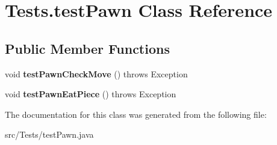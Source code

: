 \hypertarget{class_tests_1_1test_pawn}{}\section{Tests.\+test\+Pawn Class Reference}
\label{class_tests_1_1test_pawn}
\subsection*{Public Member Functions}
\begin{DoxyCompactItemize}
\item 
\mbox{\label{class_tests_1_1test_pawn_a33ba1a5790f9e7a9306ce9e2e2da1fb5}} 
void {\bfseries test\+Pawn\+Check\+Move} ()  throws Exception
\item 
\mbox{\label{class_tests_1_1test_pawn_a5420174de15332d46e17c4a217e2b812}} 
void {\bfseries test\+Pawn\+Eat\+Piece} ()  throws Exception
\end{DoxyCompactItemize}


The documentation for this class was generated from the following file\+:\begin{DoxyCompactItemize}
\item 
src/\+Tests/test\+Pawn.\+java\end{DoxyCompactItemize}
